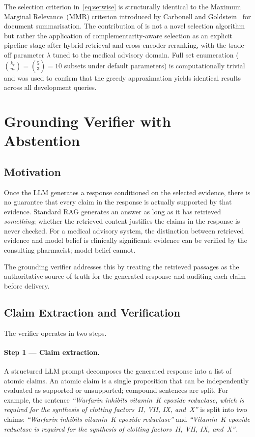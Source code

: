 The selection criterion in~\eqref{eq:setwise} is structurally identical to the
Maximum Marginal Relevance~(MMR) criterion introduced by Carbonell and
Goldstein~\cite{carbonell1998mmr} for document summarisation.
The contribution of \rarerag{} is not a novel selection algorithm but rather the
application of complementarity-aware selection as an explicit pipeline stage
after hybrid retrieval and cross-encoder reranking, with the trade-off
parameter $\lambda$ tuned to the medical advisory domain.
Full set enumeration ($\binom{k_r}{m} = \binom{5}{3} = 10$ subsets under
default parameters) is computationally trivial and was used to confirm that
the greedy approximation yields identical results across all development queries.

\section{Grounding Verifier with Abstention}
\label{sec:grounding_verifier}

\subsection{Motivation}

Once the LLM generates a response conditioned on the selected evidence,
there is no guarantee that every claim in the response is actually supported
by that evidence.
Standard RAG generates an answer as long as it has retrieved \emph{something};
whether the retrieved content justifies the claims in the response is never checked.
For a medical advisory system, the distinction between retrieved evidence and
model belief is clinically significant: evidence can be verified by the
consulting pharmacist; model belief cannot.

The grounding verifier addresses this by treating the retrieved passages as the
authoritative source of truth for the generated response and auditing each
claim before delivery.

\subsection{Claim Extraction and Verification}

The verifier operates in two steps.

\paragraph{Step 1 --- Claim extraction.}
A structured LLM prompt decomposes the generated response into a list of
atomic claims.
An atomic claim is a single proposition that can be independently evaluated
as supported or unsupported; compound sentences are split.
For example, the sentence \textit{``Warfarin inhibits vitamin~K epoxide
reductase, which is required for the synthesis of clotting factors~II, VII,
IX, and~X''} is split into two claims:
\textit{``Warfarin inhibits vitamin~K epoxide reductase''} and
\textit{``Vitamin~K epoxide reductase is required for the synthesis of clotting
factors~II, VII, IX, and~X''}.

